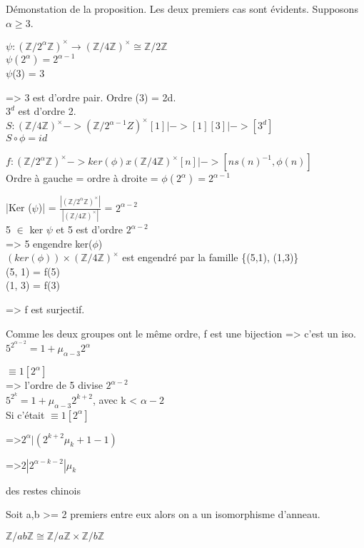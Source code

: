 \begin{dem}
	Démonstation de la proposition. Les deux premiers cas sont évidents.
	Supposons $\alpha \geq3$.
	
	$\psi : (\mathbb{Z}/2^{\alpha}\mathbb{Z})^{\times} \to (\mathbb{Z}/4\mathbb{Z})^{\times} \cong \mathbb{Z}/2\mathbb{Z}$\\
	$\psi(2^\alpha) = 2^{\alpha-1}$\\
	$\psi$(3) = 3
	
	=> 3 est d'ordre pair. Ordre (3) = 2d.\\\newline
	$3^{d}$ est d'ordre 2.\\
	$S: (\mathbb{Z}/4\mathbb{Z})^{\times} -> (\mathbb{Z}/2^{\alpha -1}Z)^{\times}
				[1] |-> [1]
				[3] |-> [3^{d}]$\\
	$S \circ \phi = id$
	
	$f : (\mathbb{Z}/2^{\alpha}\mathbb{Z})^{\times} -> ker(\phi) x (\mathbb{Z}/4\mathbb{Z})^{\times}
							[n] |-> [n s(n)^{-1}, \phi(n)]$\\
	Ordre à gauche = ordre à droite = $\phi(2^{\alpha}) = 2^{\alpha -1}$
	
	|Ker ($\psi$)| = $\frac{|(\mathbb{Z}/2^{\alpha}\mathbb{Z})^{\times}|}{|(\mathbb{Z}/4\mathbb{Z})^{\times}|}$ = $2^{\alpha-2}$\\
	5 $\in$ ker $\psi$ et 5 est d'ordre $2^{\alpha-2}$\\
	=> 5 engendre ker($\phi$)\\
	$(ker(\phi)) \times (\mathbb{Z}/4\mathbb{Z})^{\times}$ est engendré par la famille \{(5,1), (1,3)\} \\
	(5, 1) = f(5)\\
	(1, 3) = f(3)
	
	=> f est surjectif. 
	
	Comme les deux groupes ont le même ordre, f est une bijection => c'est un iso.\\
	$5^{2^{\alpha-2}} = 1+ \mu_{\alpha-3}2^\alpha$
	
	$\equiv 1[2^\alpha]$\\
	=> l'ordre de 5 divise $2^{\alpha-2}$\\
	$5^{2^k} = 1+ \mu_{\alpha-3}2^{k+2}$, avec k < $\alpha-2$\\
	Si c'était $\equiv 1 [2^\alpha]$
	
	=>$2^{\alpha} | (2^{k+2}\mu_{k} +1 -1)$
	
	=>$2 | 2^{\alpha-k-2} | \mu_{k}$
\end{dem}
\begin{thm} des restes chinois
	
	Soit a,b >= 2 premiers entre eux alors on a un isomorphisme d'anneau.
	
	$\mathbb{Z}/ab\mathbb{Z} \cong \mathbb{Z}/a\mathbb{Z} \times \mathbb{Z}/b\mathbb{Z}$
\end{thm}
